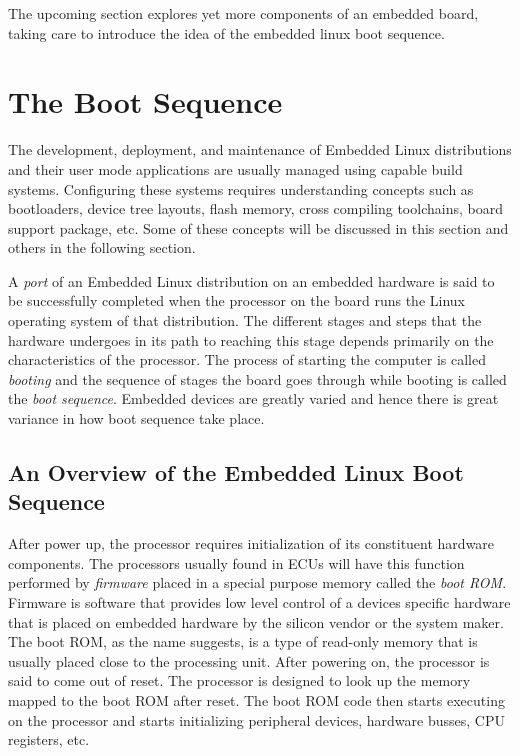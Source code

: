 The upcoming section explores yet more components of an embedded board, taking care to introduce the idea of the embedded linux boot sequence.

\section{The Boot Sequence}

The development, deployment, and maintenance of Embedded Linux distributions and their user mode applications are usually managed using capable build systems. Configuring these systems requires understanding concepts such as bootloaders, device tree layouts, flash memory, cross compiling toolchains, board support package, etc. Some of these concepts will be discussed in this section and others in the following section.

A \textit{port} of an Embedded Linux distribution on an embedded hardware is said to be successfully completed when the processor on the board runs the Linux operating system of that distribution. The different stages and steps that the hardware undergoes in its path to reaching this stage depends primarily on the characteristics of the processor. The process of starting the computer is called \textit{booting} and the sequence of stages the board goes through while booting is called the \textit{boot sequence}. Embedded devices are greatly varied and hence there is great variance in how boot sequence take place.

\subsection{An Overview of the Embedded Linux Boot Sequence}

After power up, the processor requires initialization of its constituent hardware components. The processors usually found in ECUs will have this function performed by \textit{firmware} placed in a special purpose memory called the \textit{boot ROM}. Firmware is software that provides low level control of a devices specific hardware that is placed on embedded hardware by the silicon vendor or the system maker. The boot ROM, as the name suggests, is a type of read-only memory that is usually placed close to the processing unit. After powering on, the processor is said to come out of reset. The processor is designed to look up the memory mapped to the boot ROM after reset. The boot ROM code then starts executing on the processor and starts initializing peripheral devices, hardware busses, CPU registers, etc.

